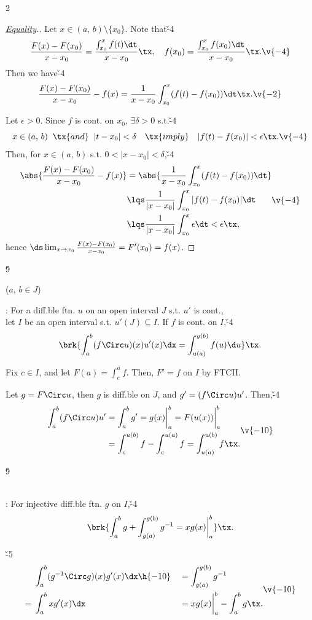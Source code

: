 \documentclass[dvipdfmx,a4paper,titlepage,9pt]{jsarticle}
\begin{document}
\begin{multicols*}{2}
\begin{pfbox}
\dotfill

\begin{proof}[\color{TGreen}\ul{Equality}.] Let $x\in(a,\,b)\setminus\{x_0\}$. Note that\v{-4}
$$\frac{F(x)-F(x_0)}{x-x_0}=\frac{\int_{x_0}^xf(t)\dt}{x-x_0}\tx,\quad f(x_0)=\frac{\int_{x_0}^x f(x_0)\dt}{x-x_0}\tx.\v{-4}$$
Then we have\v{-4}
$$\frac{F(x)-F(x_0)}{x-x_0}-f(x)=\frac1{x-x_0}\int_{x_0}^x(f(t)-f(x_0))\dt\tx.\v{-2}$$

Let $\epsilon>0$. Since $f$ is cont. on $x_0$, $\exists\delta>0$ s.t.\v{-4}
$$x\in(a,\,b)\;\;\tx{and}\;\;|t-x_0|<\delta\quad\tx{imply}\quad |f(t)-f(x_0)|<\epsilon\tx.\v{-4}$$
Then, for $x\in(a,\,b)$ s.t. $0<|x-x_0|<\delta$,\v{-4}
$$\begin{aligned}
\abs{\frac{F(x)-F(x_0)}{x-x_0}-f(x)}&=\abs{\frac1{x-x_0}\int_{x_0}^x(f(t)-f(x_0))\dt}\\
&\lqs\frac1{|x-x_0|}\int_{x_0}^x|f(t)-f(x_0)|\dt\\
&\lqs\frac1{|x-x_0|}\int_{x_0}^x\epsilon\dt<\epsilon\tx,
\end{aligned}\v{-4}$$
hence $\ds\lim_{x\to x_0}\frac{F(x)-F(x_0)}{x-x_0}=F'(x_0)=f(x)$.
\end{proof}
\end{pfbox}\v9

 {\Gray($a$, $b\in J$)}

: For a diff.ble ftn. $u$ on an open interval $J$ s.t. $u'$ is cont.,\\
\quad\;\;let $I$ be an open interval s.t. $u'(J)\subseteq I$. If $f$ is cont. on $I$,\v{-4}
$$\brk{\int_a^b(f\Circ u)(x)u'(x)\dx=\int_{u(a)}^{y(b)}f(u)\d u}\tx.$$

\begin{Pfbox}\footnotesize
Fix $c\in I$, and let $F(a)=\int_c^a f$. Then, $F'=f$ on $I$ by FTCII.

Let $g=F\Circ u$, then $g$ is diff.ble on $J$, and $g'=(f\Circ u)u'$. Then,\v{-4}
$$\begin{aligned}
\int_a^b(f\Circ u)u'&=\int_a^bg'=g(x)\bigg|_a^b=F(u(x))\bigg|_a^b\\
&=\int_c^{u(b)}f-\int_c^{u(a)}f=\int_{u(a)}^{u(b)}f\tx.
\end{aligned}\v{-10}$$
\end{Pfbox}\v9

\\
: For injective diff.ble ftn. $g$ on $I$,\v{-4}
$$\brk{\int_a^bg+\int_{g(a)}^{g(b)}g^{-1}=xg(x)\bigg|_a^b}\tx.$$

\begin{Pfbox}\footnotesize
\;\v{-5}$$\begin{aligned}
&\int_a^b(g^{-1}\Circ g)(x)g'(x)\dx\h{-10}&&=\int_{g(a)}^{g(b)}g^{-1}\\
={}&\int_a^bxg'(x)\dx&&=xg(x)\bigg|_a^b-\int_a^bg\tx.
\end{aligned}\v{-10}$$
\end{Pfbox}
\end{multicols*}
\end{document}
